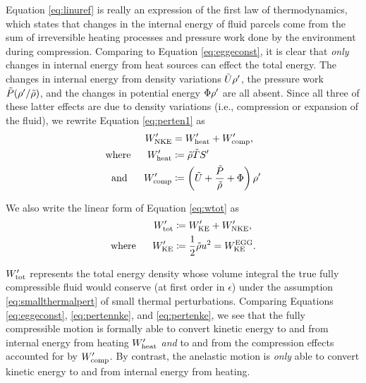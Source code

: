 \documentclass[12pt]{article}
\newcommand{\wptot}{W^\prime_{\rm tot}}
\newcommand{\wpke}{W^\prime_{\rm KE}}
\newcommand{\wpnke}{W^\prime_{\rm NKE}}
\newcommand{\wpheat}{W^\prime_{\rm heat}}
\newcommand{\wpcomp}{W^\prime_{\rm comp}}
\newcommand{\eggwke}{W^{\rm EGG}_{\rm KE}}
\begin{document}
Equation \eqref{eq:linuref} is really an expression of the first law of thermodynamics, which states that changes in the internal energy of fluid parcels come from the sum of irreversible heating processes and pressure work done by the environment during compression. Comparing to Equation \eqref{eq:eggeconst}, it is clear that \textit{only} changes in internal energy from heat sources can effect the total energy. The changes in internal energy from density variations $\tilde{U}{\rho^\prime}$, the pressure work $\tilde{P}({\rho^\prime}/\tilde{\rho})$, and the changes in potential energy $\Phi{\rho^\prime}$ are all absent. Since all three of these latter effects are due to density variations (i.e., compression or expansion of the fluid), we rewrite Equation \eqref{eq:perten1} as
\begin{subequations}\label{eq:pertennke}
	\begin{align}
		\wpnke &= \wpheat + \wpcomp,\\
		\where \wpheat&\define \rhotilde\tmptilde \entrprime\\
		\andd \wpcomp &\define \left(\intetilde+\frac{\prstilde}{\rhotilde}+\Phi\right)\rhoprime
	\end{align}
\end{subequations}

We also write the linear form of Equation \eqref{eq:wtot} as
\begin{subequations}\label{eq:pertenke}
	\begin{align}
		\wptot &\define \wpke + \wpnke,\\
		\where \wpke &\define \frac{1}{2}\rhotilde u^2 = \eggwke.
	\end{align}
\end{subequations}

$\wptot$ represents the total energy density whose volume integral the true fully compressible fluid would conserve (at first order in $\epsilon$) under the assumption \eqref{eq:smallthermalpert} of small thermal perturbations. Comparing Equations \eqref{eq:eggeconst}, \eqref{eq:pertennke}, and \eqref{eq:pertenke}, we see that the fully compressible motion is formally able to convert kinetic energy to and from internal energy from heating $\wpheat$ \textit{and} to and from the compression effects accounted for by $\wpcomp$. By contrast, the anelastic motion is \textit{only} able to convert kinetic energy to and from internal energy from heating.
\end{document}
